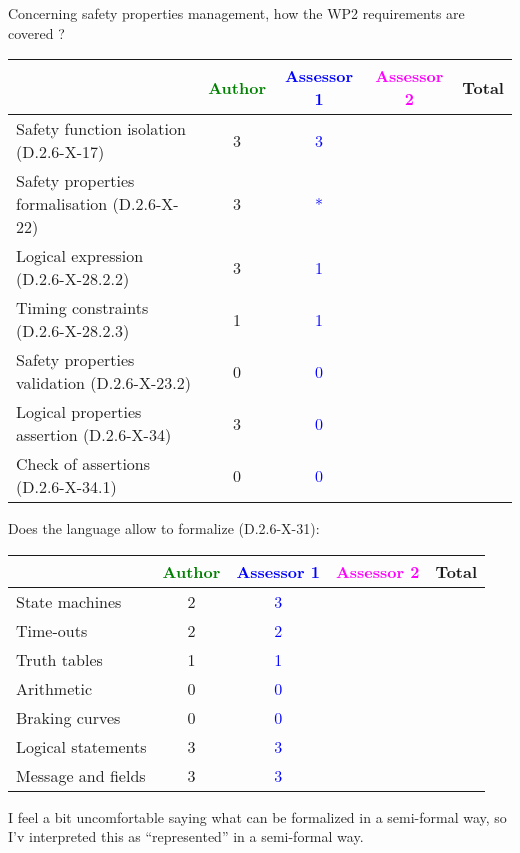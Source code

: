 Concerning safety properties management, how the WP2 requirements are covered ?

\begin{tabular}{|l | c | c | c | c|}
\hline
& \textcolor{green}{Author} & \textcolor{blue}{Assessor 1} & \textcolor{magenta}{Assessor 2} & Total \\
\hline
Safety function isolation (D.2.6-X-17) & 3 & \textcolor{blue}{3} & & \\
\hline
Safety properties formalisation (D.2.6-X-22) & 3 & \textcolor{blue}{*} & & \\
\hline
Logical expression (D.2.6-X-28.2.2) & 3 & \textcolor{blue}{1} & & \\
\hline
Timing constraints (D.2.6-X-28.2.3) & 1 & \textcolor{blue}{1} & & \\
\hline
Safety properties validation (D.2.6-X-23.2) & 0 & \textcolor{blue}{0} & & \\
\hline
Logical properties assertion (D.2.6-X-34) & 3 & \textcolor{blue}{0} & & \\
\hline
Check of assertions (D.2.6-X-34.1) & 0 & \textcolor{blue}{0} & & \\
\hline
\end{tabular}

Does the language allow to formalize (D.2.6-X-31):

\begin{tabular}{|l | c | c | c | c|}
\hline
& \textcolor{green}{Author} & \textcolor{blue}{Assessor 1} & \textcolor{magenta}{Assessor 2} & Total \\
\hline
State machines & 2 & \textcolor{blue}{3} & & \\
\hline
Time-outs & 2 & \textcolor{blue}{2} & & \\
\hline
Truth tables & 1 & \textcolor{blue}{1} & & \\
\hline
Arithmetic & 0 & \textcolor{blue}{0} & & \\
\hline
Braking curves & 0 & \textcolor{blue}{0} & & \\
\hline
Logical statements & 3 & \textcolor{blue}{3} & & \\
\hline
Message and fields & 3 & \textcolor{blue}{3} & & \\
\hline
\end{tabular}

\begin{assessor1}
I feel a bit uncomfortable saying what can be formalized in a semi-formal way, so I'v interpreted this as "`represented"' in a semi-formal way. 
\end{assessor1}

